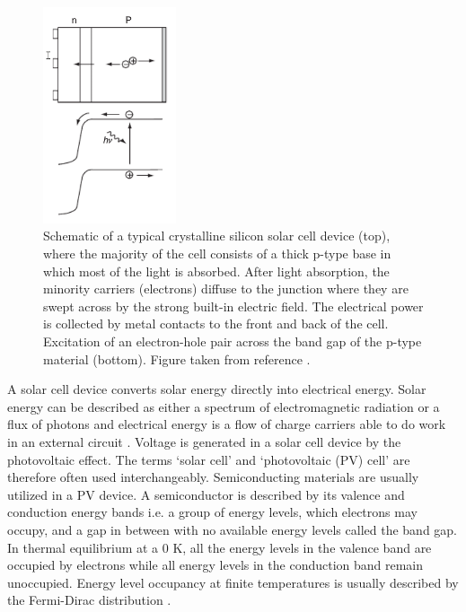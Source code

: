 \begin{figure}[h!]
  \centering
    \includegraphics[width=0.35\textwidth]{figures/PV_schematic.png}
    \caption{Schematic of a typical crystalline silicon solar cell device (top), where the majority of the cell consists of a thick p-type base in which most of the light is absorbed.  After light absorption, the minority carriers (electrons) diffuse to the junction where they are swept across by the strong built-in electric field. The electrical power is collected by metal contacts to the front and back of the cell. Excitation of an electron-hole pair across the band gap of the p-type material (bottom). 
    Figure taken from reference .}
  \label{PV_schematic}
\end{figure}

A solar cell device converts solar energy directly into electrical energy. Solar energy can be described as either a spectrum of electromagnetic radiation or a flux of photons and electrical energy is a flow of charge carriers able to do work in an external circuit \cite{spatial_resolved_book}. Voltage is generated in a solar cell device by the photovoltaic effect. The terms `solar cell' and `photovoltaic (PV) cell' are therefore often used interchangeably.  
Semiconducting materials are usually utilized in a PV device. A semiconductor is described by its valence and conduction energy
bands i.e. a group of energy levels, which electrons may occupy, and a gap in
between with no available energy levels called the band gap. In thermal equilibrium
at a 0 K, all the energy levels in the valence band are occupied by electrons
while all energy levels in the conduction band remain unoccupied. Energy level
occupancy at finite temperatures is usually described by the Fermi-Dirac distribution \cite{spatial_resolved_book}.

